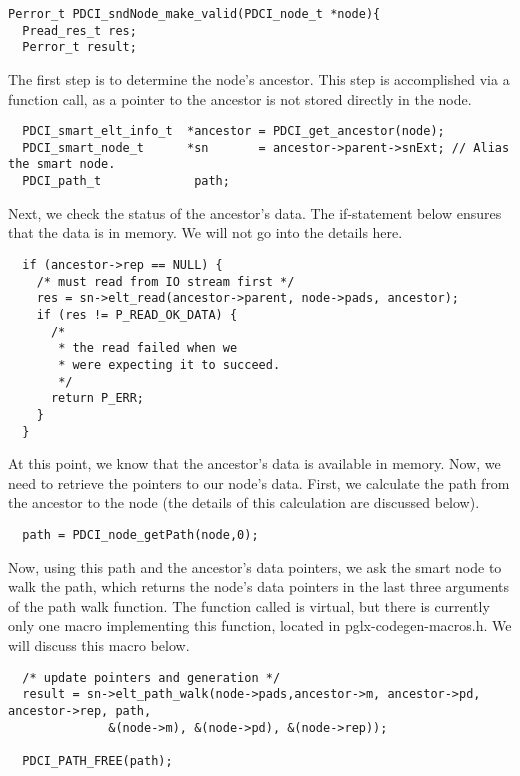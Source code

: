 \documentclass{article}
\begin{document}
\begin{verbatim}
Perror_t PDCI_sndNode_make_valid(PDCI_node_t *node){
  Pread_res_t res;
  Perror_t result;
\end{verbatim}

The first step is to determine the node's ancestor. This step is 
accomplished via a function call, as a pointer to the ancestor is not 
stored directly in the node.

\begin{verbatim}
  PDCI_smart_elt_info_t  *ancestor = PDCI_get_ancestor(node);
  PDCI_smart_node_t      *sn       = ancestor->parent->snExt; // Alias 
the smart node.
  PDCI_path_t             path;
\end{verbatim}

Next, we check the status of the ancestor's data. The if-statement below 
ensures that the data is in memory. We will not go into the details here.

\begin{verbatim}
  if (ancestor->rep == NULL) {
    /* must read from IO stream first */
    res = sn->elt_read(ancestor->parent, node->pads, ancestor);
    if (res != P_READ_OK_DATA) {
      /*
       * the read failed when we
       * were expecting it to succeed.
       */
      return P_ERR;
    }
  }
\end{verbatim}

At this point, we know that the ancestor's data is available in memory. 
Now, we need to retrieve the pointers to our node's data. First, we 
calculate the path from the ancestor to the node (the details of this 
calculation are discussed below).

\begin{verbatim}
  path = PDCI_node_getPath(node,0);
\end{verbatim}

Now, using this path and the ancestor's data pointers, we ask the smart 
node to walk the path, which returns the node's data pointers in the 
last three arguments of the path walk function. The function called is 
virtual, but there is currently only one macro implementing this 
function, located in pglx-codegen-macros.h. We will discuss this macro 
below.

\begin{verbatim}
  /* update pointers and generation */
  result = sn->elt_path_walk(node->pads,ancestor->m, ancestor->pd, 
ancestor->rep, path,
              &(node->m), &(node->pd), &(node->rep));

  PDCI_PATH_FREE(path);
\end{verbatim}
\end{document}

